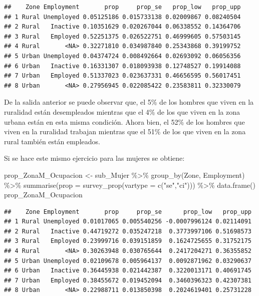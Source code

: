 \documentclass[
  12pt,
]{book}
\newenvironment{Shaded}{\begin{snugshade}}{\end{snugshade}}
\newcommand{\AttributeTok}[1]{\textcolor[rgb]{0.77,0.63,0.00}{#1}}
\newcommand{\FunctionTok}[1]{\textcolor[rgb]{0.00,0.00,0.00}{#1}}
\newcommand{\NormalTok}[1]{#1}
\newcommand{\OtherTok}[1]{\textcolor[rgb]{0.56,0.35,0.01}{#1}}
\newcommand{\SpecialCharTok}[1]{\textcolor[rgb]{0.00,0.00,0.00}{#1}}
\newcommand{\StringTok}[1]{\textcolor[rgb]{0.31,0.60,0.02}{#1}}
\begin{document}
\begin{verbatim}
##    Zone Employment       prop     prop_se   prop_low   prop_upp
## 1 Rural Unemployed 0.05125186 0.015733138 0.02009867 0.08240504
## 2 Rural   Inactive 0.10351629 0.020267044 0.06338552 0.14364706
## 3 Rural   Employed 0.52251375 0.026522751 0.46999605 0.57503145
## 4 Rural       <NA> 0.32271810 0.034987840 0.25343868 0.39199752
## 5 Urban Unemployed 0.04374724 0.008492664 0.02693092 0.06056356
## 6 Urban   Inactive 0.16331307 0.018093938 0.12748527 0.19914088
## 7 Urban   Employed 0.51337023 0.023637331 0.46656595 0.56017451
## 8 Urban       <NA> 0.27956945 0.022085422 0.23583811 0.32330079
\end{verbatim}

De la salida anterior se puede observar que, el 5\% de los hombres que viven en la ruralidad están desempleados mientras que el 4\% de los que viven en la zona urbana están en esta misma condición. Ahora bien, el 52\% de los hombres que viven en la ruralidad trabajan mientras que el 51\% de los que viven en la zona rural también están empleados.

Si se hace este mismo ejercicio para las mujeres se obtiene:

\begin{Shaded}
\begin{Highlighting}[]
\NormalTok{prop\_ZonaM\_Ocupacion }\OtherTok{\textless{}{-}}\NormalTok{ sub\_Mujer }\SpecialCharTok{\%\textgreater{}\%} 
                        \FunctionTok{group\_by}\NormalTok{(Zone, Employment) }\SpecialCharTok{\%\textgreater{}\%} 
                        \FunctionTok{summarise}\NormalTok{(}\AttributeTok{prop =} \FunctionTok{survey\_prop}\NormalTok{(}\AttributeTok{vartype =} \FunctionTok{c}\NormalTok{(}\StringTok{"se"}\NormalTok{,}\StringTok{"ci"}\NormalTok{))) }\SpecialCharTok{\%\textgreater{}\%}
                        \FunctionTok{data.frame}\NormalTok{()}
\NormalTok{prop\_ZonaM\_Ocupacion}
\end{Highlighting}
\end{Shaded}

\begin{verbatim}
##    Zone Employment       prop     prop_se      prop_low   prop_upp
## 1 Rural Unemployed 0.01017065 0.005540256 -0.0007996124 0.02114091
## 2 Rural   Inactive 0.44719272 0.035247218  0.3773997106 0.51698573
## 3 Rural   Employed 0.23999716 0.039151859  0.1624725655 0.31752175
## 4 Rural       <NA> 0.30263948 0.030765644  0.2417204271 0.36355852
## 5 Urban Unemployed 0.02109678 0.005964137  0.0092871962 0.03290637
## 6 Urban   Inactive 0.36445938 0.021442387  0.3220013171 0.40691745
## 7 Urban   Employed 0.38455672 0.019452094  0.3460396323 0.42307381
## 8 Urban       <NA> 0.22988711 0.013850398  0.2024619401 0.25731228
\end{verbatim}
\end{document}
